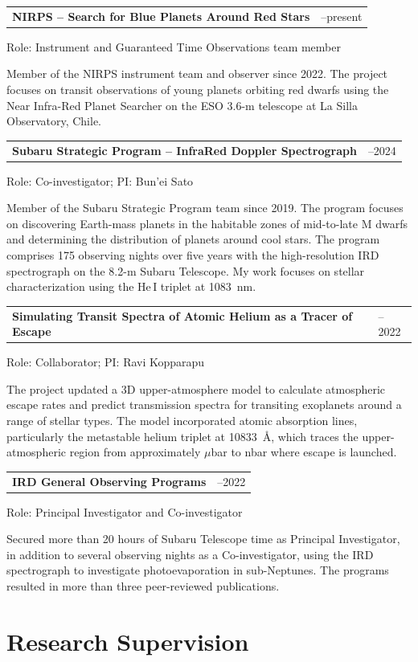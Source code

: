 \documentclass[10pt,a4paper]{article}
\makeatletter
\newcommand{\projectentry}[4]{%
\begin{tabularx}{\textwidth}{
    @{}
    >{\raggedright\arraybackslash}X
    >{\raggedleft\arraybackslash}p{2.5cm}
    @{}
}
\textbf{#1} & #2
\end{tabularx}

#3

{\color{entrylight}#4\par}

\vspace{4pt}
}
\makeatother
\begin{document}
\projectentry
{NIRPS -- Search for Blue Planets Around Red Stars}
{2022--present}
{\vspace{-1mm}Role: Instrument and Guaranteed Time Observations team member}
{\vspace{-1.5mm}Member of the NIRPS instrument team and observer since 2022.
The project focuses on transit observations of young planets orbiting
red dwarfs using the Near Infra-Red Planet Searcher on the ESO 3.6-m
telescope at La Silla Observatory, Chile.}


\projectentry
{Subaru Strategic Program -- InfraRed Doppler Spectrograph}
{2019--2024}
{\vspace{-1mm}Role: Co-investigator; PI: Bun'ei Sato}
{\vspace{-1.5mm}Member of the Subaru Strategic Program team since 2019. The program
focuses on discovering Earth-mass planets in the habitable zones of
mid-to-late M dwarfs and determining the distribution of planets around
cool stars. The program comprises 175 observing nights over five years
with the high-resolution IRD spectrograph on the 8.2-m Subaru Telescope.
My work focuses on stellar characterization using the He\,I triplet at
1083~nm.}


\projectentry
{Simulating Transit Spectra of Atomic Helium as a Tracer of Escape}
{2020--2022}
{\vspace{-1mm}Role: Collaborator; PI: Ravi Kopparapu}
{\vspace{-1.5mm}The project updated a 3D upper-atmosphere model to
calculate atmospheric escape rates and predict transmission spectra for
transiting exoplanets around a range of stellar types. The model
incorporated atomic absorption lines, particularly the metastable
helium triplet at 10833~\AA, which traces the upper-atmospheric region
from approximately $\mu$bar to nbar where escape
is launched.}


\projectentry
{IRD General Observing Programs}
{2019--2022}
{\vspace{-1mm}Role: Principal Investigator and Co-investigator}
{\vspace{-1.5mm}Secured more than 20 hours of Subaru Telescope time as Principal
Investigator, in addition to several observing nights as a
Co-investigator, using the IRD spectrograph to investigate
photoevaporation in sub-Neptunes. The programs resulted in more than
three peer-reviewed publications.}

\section{Research Supervision}
\end{document}
